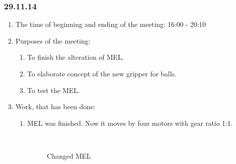 \subsubsection{29.11.14}

\begin{enumerate}
	\item The time of beginning and ending of the meeting:
	16:00 - 20:10
	\item Purposes of the meeting:
	\begin{enumerate}
		\item To finish the alteration of MEL.
		
		\item To elaborate concept of the new gripper for balls.
		
		\item To test the MEL.
		
	\end{enumerate}
	\item Work, that has been done:
	\begin{enumerate}
		\item MEL was finished. Now it moves by four motors with gear ratio 1:1.
		
		\begin{figure}[H]
			\begin{minipage}[h]{0.2\linewidth}
				\center  
			\end{minipage}
			\begin{minipage}[h]{0.6\linewidth}
				\caption{Changed MEL}
			\end{minipage}
		\end{figure}
		

\end{enumerate}
\end{enumerate}
